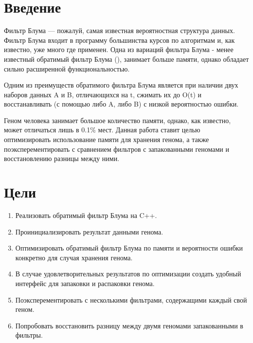 \documentclass{article}
\begin{document}
\makeTitlePage

\tableofcontents


\section{Введение}


Фильтр Блума --- пожалуй, самая известная вероятностная структура данных. Фильтр Блума входит в программу 
большинства курсов по алгоритмам и, как известно, уже много где применен. Одна из вариаций фильтра Блума -
менее известный обратимый фильтр Блума (\textcite{GoMi2011}), занимает больше памяти, однако обладает сильно расширенной функциональностью.

Одним из преимуществ обратимого фильтра Блума является при наличии двух наборов данных A и B,
отличающихся на t, сжимать их до O(t) и восстанавливать (с помощью либо A, либо B) с низкой вероятностью ошибки.

Геном человека занимает большое количество памяти, однако, как известно, может отличаться лишь в 0.1\% мест.
Данная работа ставит целью оптимизировать использование памяти для хранения генома, а также поэксперементировать с сравнением фильтров с запакованными геномами и восстановлению разницы между ними. 

\section{Цели}
\begin{enumerate}
    \item Реализовать обратимый фильтр Блума на C++.
    \item Проинициализировать результат данными генома.
    \item Оптимизировать обратимый фильтр Блума по памяти и вероятности ошибки конкретно для случая хранения генома.
    \item В случае удовлетворительных результатов по оптимизации создать удобный интерфейс для запаковки и распаковки генома.
    \item Поэксперементировать с несколькими фильтрами, содержащими каждый свой геном.
    \item Попробовать восстановить разницу между двумя геномами запакованными в фильтры.
\end{enumerate}
\end{document}

